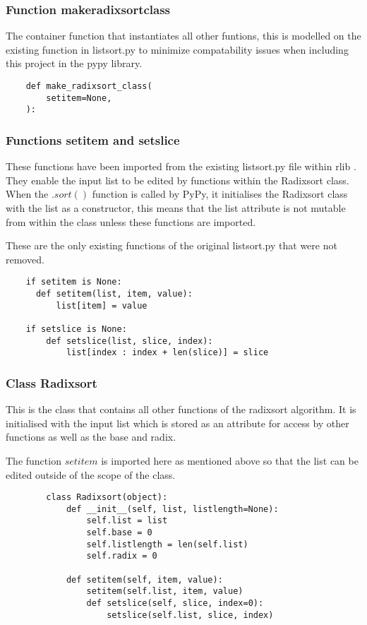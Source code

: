 \documentclass[12pt]{article}
\begin{document}
\subsubsection{Function make\textunderscore radixsort\textunderscore class}
The container function that instantiates all other funtions, this is modelled on the existing function in listsort.py \cite{listsort} to minimize compatability issues when including this project in the pypy library.
\begin{lstlisting}
    def make_radixsort_class(
        setitem=None,
    ):
  \end{lstlisting}
\subsubsection{Functions setitem and setslice}
These functions have been imported from the existing listsort.py file within rlib \cite{listsort}. They enable the input list to be edited by functions within the Radixsort class. When the $.sort()$ function is called by PyPy, it initialises the Radixsort class with the list as a constructor, this means that the list attribute is not mutable from within the class unless these functions are imported.
\par
These are the only existing functions of the original listsort.py that were not removed.
\begin{lstlisting}
    if setitem is None:
      def setitem(list, item, value):
          list[item] = value
	
	if setslice is None:
		def setslice(list, slice, index):
			list[index : index + len(slice)] = slice
  \end{lstlisting}


\subsubsection{Class Radixsort}
This is the class that contains all other functions of the radixsort algorithm. It is initialised with the input list which is stored as an attribute for access by other functions as well as the base and radix.\par
\par
The function $setitem$ is imported here as mentioned above so that the list can be edited outside of the scope of the class.
\begin{lstlisting}
        class Radixsort(object):
            def __init__(self, list, listlength=None):
                self.list = list
                self.base = 0
                self.listlength = len(self.list)
                self.radix = 0
    
            def setitem(self, item, value):
                setitem(self.list, item, value)
				def setslice(self, slice, index=0):
					setslice(self.list, slice, index)
      \end{lstlisting}
\end{document}
